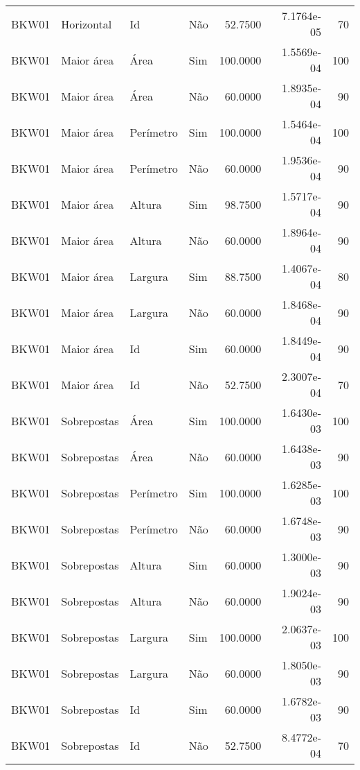 \begin{tabular}{llllrrr}
BKW01     & Horizontal  & Id        & Não         & 52.7500      & 7.1764e-05 & 70       \\
BKW01     & Maior área  & Área      & Sim         & 100.0000     & 1.5569e-04 & 100      \\
BKW01     & Maior área  & Área      & Não         & 60.0000      & 1.8935e-04 & 90       \\
BKW01     & Maior área  & Perímetro & Sim         & 100.0000     & 1.5464e-04 & 100      \\
BKW01     & Maior área  & Perímetro & Não         & 60.0000      & 1.9536e-04 & 90       \\
BKW01     & Maior área  & Altura    & Sim         & 98.7500      & 1.5717e-04 & 90       \\
BKW01     & Maior área  & Altura    & Não         & 60.0000      & 1.8964e-04 & 90       \\
BKW01     & Maior área  & Largura   & Sim         & 88.7500      & 1.4067e-04 & 80       \\
BKW01     & Maior área  & Largura   & Não         & 60.0000      & 1.8468e-04 & 90       \\
BKW01     & Maior área  & Id        & Sim         & 60.0000      & 1.8449e-04 & 90       \\
BKW01     & Maior área  & Id        & Não         & 52.7500      & 2.3007e-04 & 70       \\
BKW01     & Sobrepostas & Área      & Sim         & 100.0000     & 1.6430e-03 & 100      \\
BKW01     & Sobrepostas & Área      & Não         & 60.0000      & 1.6438e-03 & 90       \\
BKW01     & Sobrepostas & Perímetro & Sim         & 100.0000     & 1.6285e-03 & 100      \\
BKW01     & Sobrepostas & Perímetro & Não         & 60.0000      & 1.6748e-03 & 90       \\
BKW01     & Sobrepostas & Altura    & Sim         & 60.0000      & 1.3000e-03 & 90       \\
BKW01     & Sobrepostas & Altura    & Não         & 60.0000      & 1.9024e-03 & 90       \\
BKW01     & Sobrepostas & Largura   & Sim         & 100.0000     & 2.0637e-03 & 100      \\
BKW01     & Sobrepostas & Largura   & Não         & 60.0000      & 1.8050e-03 & 90       \\
BKW01     & Sobrepostas & Id        & Sim         & 60.0000      & 1.6782e-03 & 90       \\
BKW01     & Sobrepostas & Id        & Não         & 52.7500      & 8.4772e-04 & 70       \\
\hline
\end{tabular}